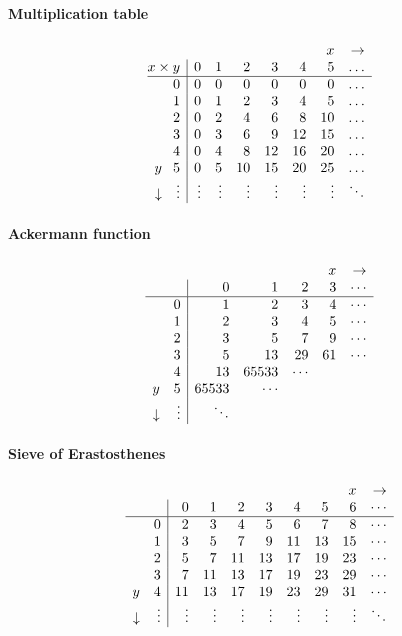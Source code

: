 \documentclass[a4paper]{article}
\begin{document}
\begin{multicols}{2}
\paragraph{Multiplication table}
\[
\begin{array}{r@{}r|rrrrrrr}
&\multicolumn{1}{r}{} & & & & & & x & \rightarrow \\
\multicolumn{2}{@{}c|}{x\times y} & 0 & 1 & 2 & 3 & 4 & 5 & \ldots \\
\hline
& 0 & 0 & 0 & 0 & 0 & 0 & 0 & \ldots \\
& 1 & 0 & 1 & 2 & 3 & 4 & 5 & \ldots \\
& 2 & 0 & 2 & 4 & 6 & 8 & 10 & \ldots \\
& 3 & 0 & 3 & 6 & 9 & 12 & 15 & \ldots \\
& 4 & 0 & 4 & 8 & 12 & 16 & 20 & \ldots \\
y & 5 & 0 & 5 & 10 & 15 & 20 & 25 & \ldots \\
\downarrow & \vdots & \vdots & \vdots & \vdots & \vdots & \vdots & \vdots & \ddots
\end{array}
\]

\paragraph{Ackermann function}
\[
\begin{array}{rr|rrrrrrrrrrrrrr@{}}
&\multicolumn{1}{r}{} & & & & x & \rightarrow \\
& & 0 & 1 & 2 & 3 & \cdots \\
\hline
& 0 & 1 & 2 & 3 & 4 & \cdots \\
& 1 & 2 & 3 & 4 & 5 & \cdots \\
& 2 & 3 & 5 & 7 & 9 & \cdots \\
& 3 & 5 & 13 & 29 & 61 & \cdots \\
& 4 & 13 & 65533 & \cdots \\
y & 5 & 65533 & \cdots \\
\downarrow & \vdots & \ddots
\end{array}
\]

\paragraph{Sieve of Erastosthenes}
\[
\begin{array}{rr|rrrrrrrrrrrrrr@{}}
&\multicolumn{1}{r}{} & & & & & & & x & \rightarrow \\
& & 0 & 1 & 2 & 3 & 4 & 5 & 6 & \cdots \\
\hline
& 0 & 2 & 3 & 4 & 5 & 6 & 7 & 8 & \cdots \\
& 1 & 3 & 5 & 7 & 9 & 11 & 13 & 15 & \cdots \\
& 2 & 5 & 7 & 11 & 13 & 17 & 19 & 23 & \cdots \\
& 3 & 7 & 11 & 13 & 17 & 19 & 23 & 29 & \cdots \\
y & 4 & 11 & 13 & 17 & 19 & 23 & 29 & 31 & \cdots \\
\downarrow & \vdots & \vdots & \vdots & \vdots & \vdots & \vdots & \vdots & \vdots & \ddots
\end{array}
\]


\end{multicols}
\end{document}
